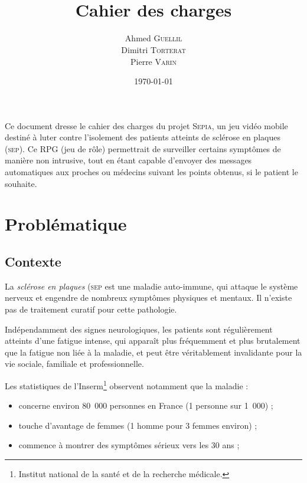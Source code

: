 \documentclass[a4paper,12pt,francais]{article}
\title{\Sepia\\Cahier des charges}
\author{
    Ahmed \textsc{Guellil}\\
    Dimitri \textsc{Torterat}\\
    Pierre \textsc{Varin}
}
\date{\today} %
\newcommand{\SEP}{\textsc{sep}\xspace}
\newcommand{\Sepia}{\textsc{Sepia}\xspace}
\begin{document}
\renewcommand{\contentsname}{Sommaire}

\maketitle

Ce document dresse le cahier des charges du projet \Sepia, un jeu vidéo mobile destiné à luter contre l’isolement des patients atteints de sclérose en plaques (\SEP). Ce RPG (jeu de rôle) permettrait de surveiller certains symptômes de manière non intrusive, tout en étant capable d’envoyer des messages automatiques aux proches ou médecins suivant les points obtenus, si le patient le souhaite.


\newpage
\tableofcontents
\newpage

\section{Problématique}
\subsection{Contexte}

La \emph{sclérose en plaques} (\textsc{sep} est une maladie auto-immune, qui attaque le système nerveux et engendre de nombreux symptômes physiques et mentaux. Il n’existe pas de traitement curatif pour cette pathologie.

Indépendamment des signes neurologiques, les patients sont régulièrement atteints d’une fatigue intense, qui apparaît plus fréquemment et plus brutalement que la fatigue non liée à la maladie, et peut être véritablement invalidante pour la vie sociale, familiale et professionnelle.

Les statistiques de l’Inserm\footnote{Institut national de la santé et de la recherche médicale.} observent notamment que la maladie :
\begin{itemize}
\item concerne environ 80~000 personnes en France (1 personne sur 1~000) ;
\item touche d’avantage de femmes (1 homme pour 3 femmes environ) ;
\item commence à montrer des symptômes sérieux vers les 30 ans ;
\end{itemize}
\end{document}

